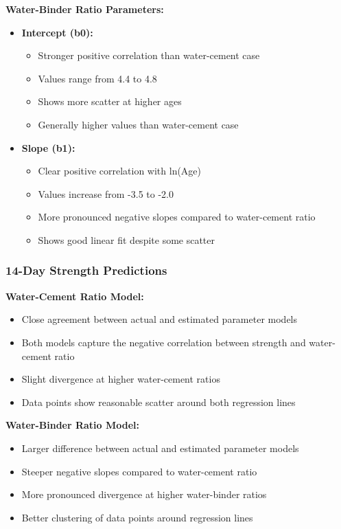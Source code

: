 \documentclass[a4paper,11pt]{article}
\begin{document}
\textbf{Water-Binder Ratio Parameters:}
\begin{itemize}
    \item \textbf{Intercept (b0):}
        \begin{itemize}
            \item Stronger positive correlation than water-cement case
            \item Values range from 4.4 to 4.8
            \item Shows more scatter at higher ages
            \item Generally higher values than water-cement case
        \end{itemize}
    \item \textbf{Slope (b1):}
        \begin{itemize}
            \item Clear positive correlation with ln(Age)
            \item Values increase from -3.5 to -2.0
            \item More pronounced negative slopes compared to water-cement ratio
            \item Shows good linear fit despite some scatter
        \end{itemize}
\end{itemize}

\subsubsection*{14-Day Strength Predictions}

\textbf{Water-Cement Ratio Model:}
\begin{itemize}
    \item Close agreement between actual and estimated parameter models
    \item Both models capture the negative correlation between strength and water-cement ratio
    \item Slight divergence at higher water-cement ratios
    \item Data points show reasonable scatter around both regression lines
\end{itemize}

\textbf{Water-Binder Ratio Model:}
\begin{itemize}
    \item Larger difference between actual and estimated parameter models
    \item Steeper negative slopes compared to water-cement ratio
    \item More pronounced divergence at higher water-binder ratios
    \item Better clustering of data points around regression lines
\end{itemize}
\end{document}
